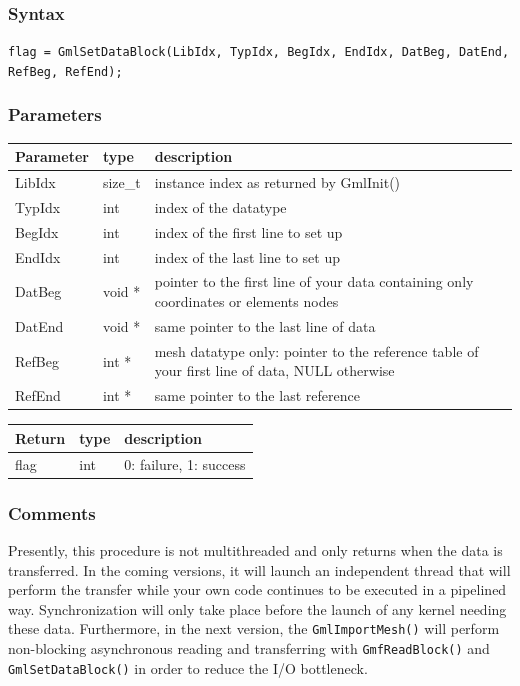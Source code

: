 \documentclass[a4paper,12pt]{article}
\begin{document}
\subsubsection*{Syntax}
{\tt flag = GmlSetDataBlock(LibIdx, TypIdx, BegIdx, EndIdx, DatBeg, DatEnd, RefBeg, RefEnd);}

\subsubsection*{Parameters}
\begin{tabular}{|m{2cm}|m{1.5cm}|m{10.5cm}|}
\hline
Parameter  & type    & description \\
\hline
LibIdx     & size\_t & instance index as returned by GmlInit() \\
\hline
TypIdx     & int     & index of the datatype \\
\hline
BegIdx     & int     & index of the first line to set up \\
\hline
EndIdx     & int     & index of the last line to set up \\
\hline
DatBeg     & void *  & pointer to the first line of your data containing only coordinates or elements nodes \\
\hline
DatEnd     & void *  & same pointer to the last line of data \\
\hline
RefBeg     & int *   & mesh datatype only: pointer to the reference table of your first line of data, NULL otherwise \\
\hline
RefEnd     & int *   & same pointer to the last reference \\
\hline
\end{tabular}

\medskip

\begin{tabular}{|m{2cm}|m{1.5cm}|m{10.5cm}|}
\hline
Return     & type   & description \\
\hline
flag       & int    & 0: failure, 1: success \\
\hline
\end{tabular}

\subsubsection*{Comments}
Presently, this procedure is not multithreaded and only returns when the data is transferred. In the coming versions, it will launch an independent thread that will perform the transfer while your own code continues to be executed in a pipelined way. Synchronization will only take place before the launch of any kernel needing these data. Furthermore, in the next version, the {\tt GmlImportMesh()} will perform non-blocking asynchronous reading and transferring with {\tt GmfReadBlock()} and {\tt GmlSetDataBlock()} in order to reduce the I/O bottleneck.
\end{document}
